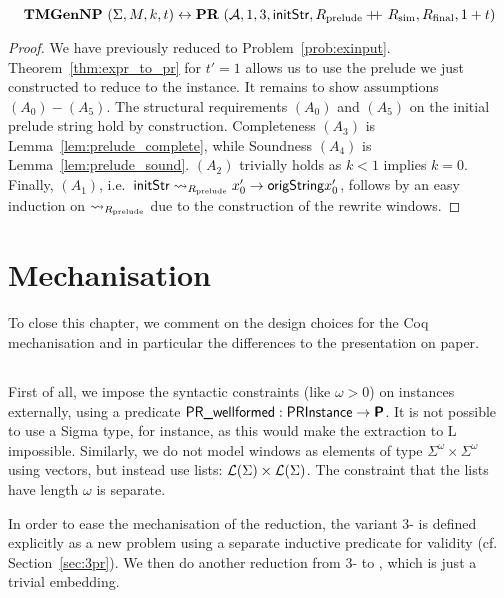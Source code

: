 \begin{theorem}
  \[\textbf{TMGenNP}~(\Sigma, M, k, t) \leftrightarrow \textbf{PR}~(\mathcal{A}, 1, 3, \textsf{initStr}, R_{\text{prelude}} +\kern-1.3ex+\kern0.8ex R_{\text{sim}}, R_{\text{final}}, 1 + t) \]
\end{theorem}
\begin{proof}
  We have previously reduced \gennp{} to Problem~\ref{prob:exinput}. Theorem~\ref{thm:expr_to_pr} for $t' = 1$ allows us to use the prelude we just constructed to reduce to the \PR{} instance.
  It remains to show assumptions $(A_0) - (A_5)$. 
  The structural requirements $(A_0)$ and $(A_5)$ on the initial prelude string hold by construction. 
  Completeness $(A_3)$ is Lemma~\ref{lem:prelude_complete}, while Soundness $(A_4)$ is Lemma~\ref{lem:prelude_sound}. 
  $(A_2)$ trivially holds as $k < 1$ implies $k = 0$. Finally, $(A_1)$, i.e.\ $\textsf{initStr} \rightsquigarrow_{R_{\text{prelude}}} x_0' \rightarrow \textsf{origString}{x_0'}$, follows by an easy induction on $\rightsquigarrow_{R_{\text{prelude}}}$ due to the construction of the rewrite windows. 
\end{proof}

\section{Mechanisation}
To close this chapter, we comment on the design choices for the Coq mechanisation and in particular the differences to the presentation on paper. 

\subsection{\PR{}}
First of all, we impose the syntactic constraints (like $\omega > 0$) on \PR{} instances externally, using a predicate $\textsf{PR\_wellformed} : \textsf{PRInstance} \rightarrow \textsf{\bfseries P}$. 
It is not possible to use a Sigma type, for instance, as this would make the extraction to L impossible. 
Similarly, we do not model windows as elements of type $\Sigma^\omega \times \Sigma^\omega$ using vectors, but instead use lists: $\mathcal{L} (\Sigma) \times \mathcal{L} (\Sigma)$. The constraint that the lists have length $\omega$ is separate.

In order to ease the mechanisation of the reduction, the variant 3-\PR{} is defined explicitly as a new problem using a separate inductive predicate for validity (cf. Section~\ref{sec:3pr}). 
We then do another reduction from 3-\PR{} to \PR{}, which is just a trivial embedding.

